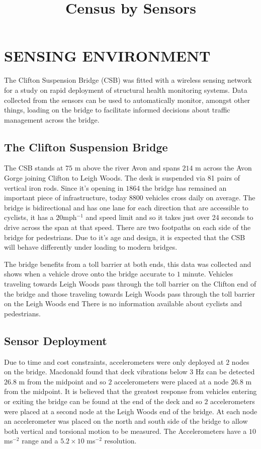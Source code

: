 \documentclass[a4paper,11pt,twocolumn]{article}
\title{Census by Sensors}
\begin{document}
\maketitle
\section{\uppercase{Sensing Environment}}
The Clifton Suspension Bridge (CSB) was fitted with a wireless sensing network for a study on rapid deployment of structural health monitoring systems. Data collected from the sensors can be used to automatically monitor, amongst other things, loading on the bridge to facilitate informed decisions about traffic management across the bridge. 

\subsection{The Clifton Suspension Bridge}
The CSB stands at $75$ m above the river Avon and spans $214$ m across the Avon Gorge joining Clifton to Leigh Woods. The desk is suspended via 81 pairs of vertical iron rods. Since it's opening in $1864$ the bridge has remained an important piece of infrastructure, today $8800$ vehicles cross daily on average. The bridge is bidirectional and has one lane for each direction that are accessible to cyclists, it has a $20$mph$^{-1}$ and speed limit and so it takes just over 24 seconds to drive across the span at that speed. There are two footpaths on each side of the bridge for pedestrians. Due to it's age and design, it is expected that the CSB will behave differently under loading to modern bridges.

The bridge benefits from a toll barrier at both ends, this data was collected and shows when a vehicle drove onto the bridge accurate to $1$ minute. Vehicles traveling towards Leigh Woods pass through the toll barrier on the Clifton end of the bridge and those traveling towards Leigh Woods pass through the toll barrier on the Leigh Woods end There is no information available about cyclists and pedestrians.

\subsection{Sensor Deployment}
Due to time and cost constraints, accelerometers were only deployed at $2$ nodes on the bridge. Macdonald found that deck vibrations below $3$ Hz can be detected $26.8$ m from the midpoint and so $2$ accelerometers were placed at a node $26.8$ m from the midpoint. It is believed that the greatest response from vehicles entering or exiting the bridge can be found at the end of the deck and so $2$ accelerometers were placed at a second node at the Leigh Woods end of the bridge. At each node an accelerometer was placed on the north and south side of the bridge to allow both vertical and torsional motion to be measured. The Accelerometers have a $10$ ms$^{-2}$ range and a $5.2{\times}10$ ms$^{-2}$ resolution.
\end{document}
